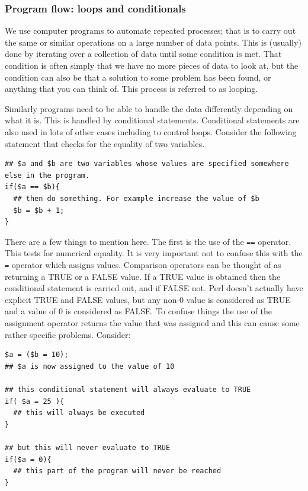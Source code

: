 \documentclass[11pt]{article}
\begin{document}
\subsubsection{Program flow: loops and conditionals}
\label{sec-5-0-4}

We use computer programs to automate repeated processes; that is to
carry out the same or similar operations on a large number of data
points. This is (usually) done by iterating over a collection of data
until some condition is met. That condition is often simply that we have
no more pieces of data to look at, but the condition can also be that a
solution to some problem has been found, or anything that you can think
of. This process is referred to as looping.

Similarly programs need to be able to handle the data differently
depending on what it is. This is handled by conditional statements.
Conditional statements are also used in lots of other cases including to
control loops. Consider the following statement that checks for the
equality of two variables.

\begin{verbatim}
## $a and $b are two variables whose values are specified somewhere else in the program.
if($a == $b){
  ## then do something. For example increase the value of $b
  $b = $b + 1;
}
\end{verbatim}

There are a few things to mention here. The first is the use of the \texttt{==}
operator. This tests for numerical equality. It is very important not to
confuse this with the \texttt{=} operator which assigns values. Comparison
operators can be thought of as returning a TRUE or a FALSE value. If a
TRUE value is obtained then the conditional statement is carried out,
and if FALSE not. Perl doesn't actually have explicit TRUE and FALSE
values, but any non-0 value is considered as TRUE and a value of 0 is
considered as FALSE. To confuse things the use of the assignment
operator returns the value that was assigned and this can cause some
rather specific problems. Consider:

\begin{verbatim}
$a = ($b = 10);
## $a is now assigned to the value of 10

## this conditional statement will always evaluate to TRUE
if( $a = 25 ){
  ## this will always be executed
}

## but this will never evaluate to TRUE
if($a = 0){
  ## this part of the program will never be reached
}
\end{verbatim}
\end{document}
